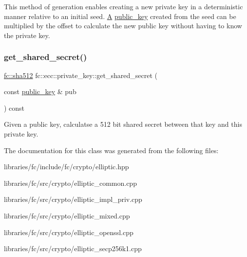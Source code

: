 This method of generation enables creating a new private key in a deterministic manner relative to an initial seed. \mbox{\hyperlink{struct_a}{A}} \mbox{\hyperlink{classfc_1_1ecc_1_1public__key}{public\+\_\+key}} created from the seed can be multiplied by the offset to calculate the new public key without having to know the private key. \mbox{\label{classfc_1_1ecc_1_1private__key_a81a1b0f5dacfd6f611d8291a0df60be7}} 
\subsubsection{\texorpdfstring{get\+\_\+shared\+\_\+secret()}{get\_shared\_secret()}}
{\footnotesize\ttfamily \mbox{\hyperlink{classfc_1_1sha512}{fc\+::sha512}} fc\+::ecc\+::private\+\_\+key\+::get\+\_\+shared\+\_\+secret (\begin{DoxyParamCaption}\item[{const \mbox{\hyperlink{classfc_1_1ecc_1_1public__key}{public\+\_\+key}} \&}]{pub }\end{DoxyParamCaption}) const}

Given a public key, calculatse a 512 bit shared secret between that key and this private key. 

The documentation for this class was generated from the following files\+:\begin{DoxyCompactItemize}
\item 
libraries/fc/include/fc/crypto/elliptic.\+hpp\item 
libraries/fc/src/crypto/elliptic\+\_\+common.\+cpp\item 
libraries/fc/src/crypto/elliptic\+\_\+impl\+\_\+priv.\+cpp\item 
libraries/fc/src/crypto/elliptic\+\_\+mixed.\+cpp\item 
libraries/fc/src/crypto/elliptic\+\_\+openssl.\+cpp\item 
libraries/fc/src/crypto/elliptic\+\_\+secp256k1.\+cpp\end{DoxyCompactItemize}
